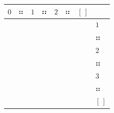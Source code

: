 {\scriptsize\setlength{\tabcolsep}{1.5pt}%
\begin{tabular}{ccccccc|l}
$0$ & $\cons$ & \cellcolor{blue!10}$1$ & $\cons$ & $2$ & $\cons$ & $[\,]$ & \\ \hline
\gcell{$\posD{\bullet}$} & \gcell{$\posC{\circ}$} & \gcell{$$} & \gcell{$$} & \gcell{$$} & \gcell{$$} & \gcell{$$} & $1$ \\
\gcell{$$} & \gcell{$\posC{\circ}$} & \gcell{$$} & \gcell{$$} & \gcell{$$} & \gcell{$$} & \gcell{$$} & $\cons$ \\
\cellcolor{blue!10}\gcell{$$} & \cellcolor{blue!10}\gcell{$\posC{\circ}$} & \cellcolor{blue!10}\gcell{$\posD{\bullet}$} & \cellcolor{blue!10}\gcell{$\posC{\circ}$} & \cellcolor{blue!10}\gcell{$$} & \cellcolor{blue!10}\gcell{$$} & \cellcolor{blue!10}\gcell{$$} & \cellcolor{blue!25}$2$ \\
\gcell{$$} & \gcell{$\posC{\circ}$} & \gcell{$$} & \gcell{$\posC{\circ}$} & \gcell{$$} & \gcell{$$} & \gcell{$$} & $\cons$ \\
\gcell{$$} & \gcell{$\posC{\circ}$} & \gcell{$$} & \gcell{$\posC{\circ}$} & \gcell{$\posD{\bullet}$} & \gcell{$\posC{\circ}$} & \gcell{$$} & $3$ \\
\gcell{$$} & \gcell{$\posC{\circ}$} & \gcell{$$} & \gcell{$\posC{\circ}$} & \gcell{$$} & \gcell{$\posC{\circ}$} & \gcell{$$} & $\cons$ \\
\gcell{$$} & \gcell{$\posC{\circ}$} & \gcell{$$} & \gcell{$\posC{\circ}$} & \gcell{$$} & \gcell{$\posC{\circ}$} & \gcell{$\posC{\circ}$} & $[\,]$ \\
\end{tabular}}
